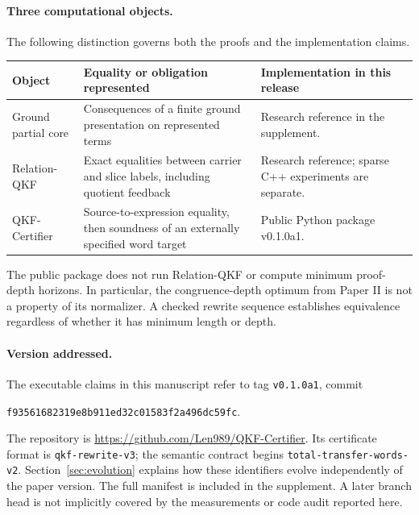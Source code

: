 \paragraph{Three computational objects.}
The following distinction governs both the proofs and the implementation claims.
\begin{center}
\begin{tabularx}{\textwidth}{@{}lXX@{}}
\toprule
Object & Equality or obligation represented & Implementation in this release\\
\midrule
Ground partial core & Consequences of a finite ground presentation on represented terms & Research reference in the supplement.\\
Relation-QKF & Exact equalities between carrier and slice labels, including quotient feedback & Research reference; sparse C++ experiments are separate.\\
QKF-Certifier & Source-to-expression equality, then soundness of an externally specified word target & Public Python package v0.1.0a1.\\
\bottomrule
\end{tabularx}
\end{center}
The public package does not run Relation-QKF or compute minimum proof-depth horizons. In particular, the congruence-depth optimum from Paper II is not a property of its normalizer. A checked rewrite sequence establishes equivalence regardless of whether it has minimum length or depth.

\paragraph{Version addressed.}
The executable claims in this manuscript refer to tag \texttt{v0.1.0a1}, commit
\begin{center}\small\texttt{f93561682319e8b911ed32c01583f2a496dc59fc}.\end{center}
The repository is \url{https://github.com/Len989/QKF-Certifier}. Its certificate format is \texttt{qkf-rewrite-v3}; the semantic contract begins \texttt{total-transfer-words-v2}. Section~\ref{sec:evolution} explains how these identifiers evolve independently of the paper version. The full manifest is included in the supplement. A later branch head is not implicitly covered by the measurements or code audit reported here.
